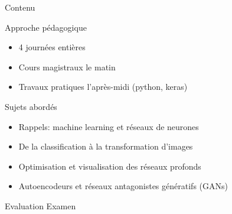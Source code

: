 \documentclass[xcolor=pdftex,dvipsnames,table,mathserif]{beamer}
\begin{document}
\begin{frame}{Contenu}


\begin{block}{Approche pédagogique}

  \begin{itemize}
  \item 4 journées entières
  \item Cours magistraux le matin
  \item Travaux pratiques l'après-midi (python, keras)
  \end{itemize}
\end{block}

\begin{block}{Sujets abordés}
\begin{itemize}
\item Rappels: machine learning et réseaux de neurones
\item De la classification à la transformation d'images
\item Optimisation et visualisation des réseaux profonds
\item Autoencodeurs et réseaux antagonistes génératifs (GANs)
\end{itemize}
\end{block}

  \begin{block}{Evaluation}
  Examen
  \end{block}

\end{frame}


\end{document}
